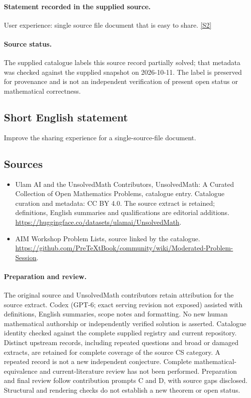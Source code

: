 \documentclass[11pt]{article}
\begin{document}
\paragraph{Statement recorded in the supplied source.}
User experience: single source file document that is easy to share. \href{https://github.com/PreTeXtBook/community/wiki/Moderated-Problem-Session}{[S2]}
\paragraph{Source status.}
The supplied catalogue labels this source record partially solved; that metadata was checked against the supplied snapshot on 2026-10-11. The label is preserved for provenance and is not an independent verification of present open status or mathematical correctness.
\subsection{Short English statement}
Improve the sharing experience for a single-source-file document.
\subsection{Sources}
\begin{itemize}
\item[S1] Ulam AI and the UnsolvedMath Contributors, UnsolvedMath: A Curated Collection of Open Mathematics Problems, catalogue entry. Catalogue curation and metadata: CC BY 4.0. The source extract is retained; definitions, English summaries and qualifications are editorial additions.
\url{https://huggingface.co/datasets/ulamai/UnsolvedMath}.
\item[S2] AIM Workshop Problem Lists, source linked by the catalogue.
\url{https://github.com/PreTeXtBook/community/wiki/Moderated-Problem-Session}.
\end{itemize}
\paragraph{Preparation and review.}
The original source and UnsolvedMath contributors retain attribution for the source extract. Codex (GPT-6; exact serving revision not exposed) assisted with definitions, English summaries, scope notes and formatting. No new human mathematical authorship or independently verified solution is asserted. Catalogue identity checked against the complete supplied registry and current repository. Distinct upstream records, including repeated questions and broad or damaged extracts, are retained for complete coverage of the source CS category. A repeated record is not a new independent conjecture. Complete mathematical-equivalence and current-literature review has not been performed. Preparation and final review follow contribution prompts C and D, with source gaps disclosed. Structural and rendering checks do not establish a new theorem or open status.
\label{end:statement}
\end{document}
